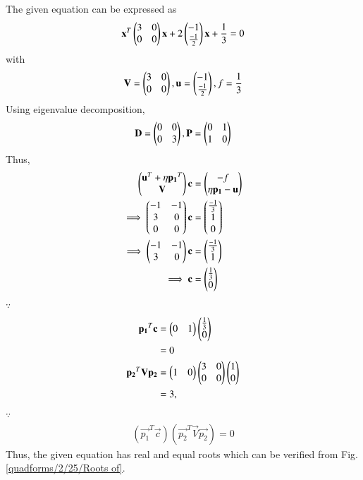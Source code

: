 
The given equation can be expressed as
\begin{align}
\mathbf{x}^T \begin{pmatrix}3 & 0\\0 & 0\end{pmatrix}\mathbf{x}+ 2\begin{pmatrix}-1 \\ \frac{-1}{2}\end{pmatrix}\mathbf{x}+\frac{1}{3}=0
\end{align}
with
\begin{align}
\mathbf{V} = \begin{pmatrix}3 & 0 \\ 0 & 0\end{pmatrix},\mathbf{u}=\begin{pmatrix}-1 \\ \frac{-1}{2}\end{pmatrix},f=\frac{1}{3}
\end{align}
Using eigenvalue decomposition,
\begin{align}
\mathbf{D} = \begin{pmatrix}0 & 0\\0 & 3\end{pmatrix} ,\mathbf{P}=\begin{pmatrix}0 & 1\\1 & 0\end{pmatrix}
\end{align}
Thus,
\begin{align}
\begin{pmatrix}\mathbf{u}^T + \eta\mathbf{p_1}^T \\ \mathbf{V}\end{pmatrix}\mathbf{c} &= \begin{pmatrix}-f \\ \eta\mathbf{p_1}-\mathbf{u}\end{pmatrix} 
\\
\implies \begin{pmatrix}-1 & -1 \\ 3 & 0 \\ 0 & 0\end{pmatrix}\mathbf{c} &= \begin{pmatrix}\frac{-1}{3}\\ 1 \\ 0\end{pmatrix} \\
\implies  \begin{pmatrix}-1 & -1 \\ 3 & 0\end{pmatrix}\mathbf{c} &= \begin{pmatrix}\frac{-1}{3}\\ 1\end{pmatrix}
\\
\implies \mathbf{c} &= \begin{pmatrix}\frac{1}{3}\\0\end{pmatrix}
\end{align}
$\because$
\begin{align}
\mathbf{p_1}^T\mathbf{c} &= \begin{pmatrix}0 & 1\end{pmatrix}\begin{pmatrix}\frac{1}{3}\\0\end{pmatrix}
\\
&= 0
\\
\mathbf{p_2}^T\mathbf{V}\mathbf{p_2} &= \begin{pmatrix}1 & 0\end{pmatrix}\begin{pmatrix}3 & 0\\0& 0\end{pmatrix}\begin{pmatrix}1 \\ 0\end{pmatrix}
\\
&= 3,
\end{align}
$\because$
\begin{align}
(\vec{p_1}^T\vec{c})(\vec{p_2}^T\vec{V}\vec{p_2}) = 0
\end{align}
Thus, the given equation has  real and equal roots which can be verified from Fig. \ref{quadforms/2/25/Roots of}.  
%
